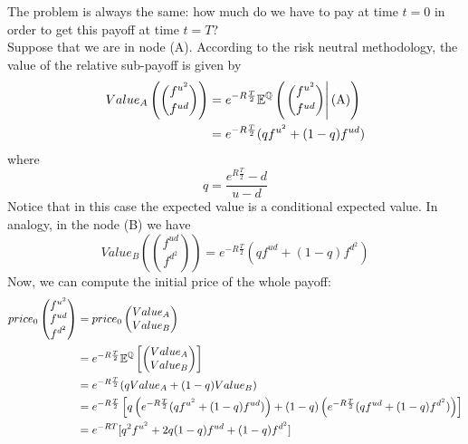 The problem is always the same: how much do we have to pay at time $t=0$ in order to get this payoff at time $t=T$?\\
Suppose that we are in node (A). According to the risk neutral methodology, the value of the relative sub-payoff is given by
\begin{align}
    \notag Value_A\left(\binom{f^{u^2}}{f^{ud}}\right) 
    &= 
    \notag e^{-R\frac{T}{2}}\mathbb{E}^{\mathbb{Q}}\left(\left.\binom{f^{u^2}}{f^{ud}}\right|\mbox{(A)}\right)\\
    &=
    e^{-R\frac{T}{2}}(qf^{u^2}+(1-q)f^{ud})
\end{align}
where
\begin{equation}\label{qT2}
    q = \dfrac{e^{R\frac{T}{2}}-d}{u-d}
\end{equation}
Notice that in this case the expected value is a conditional expected value. In analogy, in the node (B) we have
\begin{equation}
    Value_B\left(\binom{f^{ud}}{f^{d^2}}\right) = e^{-R\frac{T}{2}}(qf^{ud}+(1-q)f^{d^2})
\end{equation}
Now, we can compute the initial price of the whole payoff:
\begin{align}
    \notag price_0\left(
    \begin{matrix}
        f^{u^2} \\ f^{ud} \\ f^{d^2}
    \end{matrix}
    \right) 
    &= 
    price_0\left(\begin{matrix}
        Value_A \\  Value_B
    \end{matrix}\right)\\
    &=
    \notag e^{-R\frac{T}{2}}\mathbb{E}^{\mathbb{Q}}\left[\left(
    \begin{matrix}
        Value_A \\  Value_B
    \end{matrix}\right)
    \right]\\
    &=
    \notag e^{-R\frac{T}{2}}(q Value_A+(1-q)Value_B)\\
    &=
    \notag e^{-R\frac{T}{2}}\left[q\left(e^{-R\frac{T}{2}}(qf^{u^2}+(1-q)f^{ud})\right) + (1-q)\left(e^{-R\frac{T}{2}}(qf^{ud}+(1-q)f^{d^2})\right)\right]\\
    &=
    e^{-RT}[q^2f^{u^2}+2q(1-q)f^{ud}+(1-q)f^{d^2}]
\end{align}
